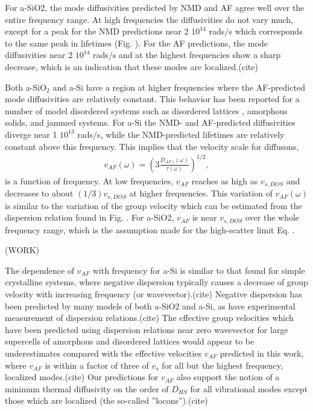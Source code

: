 \documentclass[aps,prb,twocolumn,superscriptaddress,footinbib,amsmath,amssymb,floatfix]{revtex4}
\begin{document}
For a-SiO2, the mode diffusivities predicted by NMD and AF agree 
well over the entire frequency range. At high frequencies the 
diffusivities do not vary much, except for a 
peak for the NMD predictions near 2 $10^{14}$ rads/s which 
corresponds to the same peak in lifetimes (Fig. ). For 
the AF predictions, the mode diffusivities near 
2 $10^{14}$ rads/s and at the highest frequencies 
show a sharp decrease, which is an indication 
that these modes are localized.(cite) 

Both a-SiO$_2$ and a-Si have a region at higher frequencies where the 
AF-predicted mode diffusivities are relatively constant. This behavior 
has been reported for a number of model disordered systems such as 
disordered lattices
\cite{sheng_heat_1991,beltukov_ioffe-regel_2013,larkin_predicting_2013}, 
amorphous solids,\cite{he_thermal_2011} 
and jammed systems.\cite{xu_energy_2009,vitelli_heat_2010}  
For a-Si the NMD- and AF-predicted diffusivities diverge 
near 1 $10^{13}$ rads$/$s, while the NMD-predicted lifetimes 
are relatively constant above this frequency.  This implies 
that the velocity scale for diffusons,
\begin{equation}\label{EQ:vAF}
\begin{split}
v_{AF}(\omega) = \left(3\frac{D_{AF,i}(\omega)}{\tau(\omega)}\right)^{1/2},
\end{split}
\end{equation}
is a function of frequency. At low frequencies, $v_{AF}$ 
reaches as high as $v_{s,DOS}$ and decreases to about $(1/3) v_{s,DOS}$ 
at higher frequencies. This variation of $v_{AF}(\omega)$ is similar 
to the variation of the group velocity which can be estimated from 
the dispersion relation found in Fig. . For a-SiO2, $v_{AF}$ is near 
$v_{s,DOS}$ over the whole frequency range, which is the assumption 
made for the high-scatter limit Eq. .

(WORK)

The dependence of $v_{AF}$ with frequency for a-Si is similar to 
that found for 
simple crystalline systems, where negative dispersion typically 
causes a decrease of group velocity with increasing frequency (or 
wavevector).(cite) Negative dispersion has been predicted by many 
models of both a-SiO2 and a-Si,\cite{ruocco_relaxation_2000} 
as have experimental measurement of 
dispersion relations.(cite) The effective group velocities 
which have been predicted using dispersion relations near zero 
wavevector for large supercells of amorphous\cite{he_thermal_2011,he_heat_2011} 
and disordered lattices\cite{hori_phonon_2013} would appear to 
be underestimates 
compared with the effective velocities $v_{AF}$ predicted in this work, 
where $v_{AF}$ is within a factor of three of $v_s$ for all but the 
highest frequency, localized modes.(cite) Our predictions for 
$v_{AF}$ also support the notion of a minimum thermal diffusivity 
on the order of $D_{HS}$ for all vibrational modes except   
those which are localized (the so-called ''locons'').(cite) 
\end{document}
